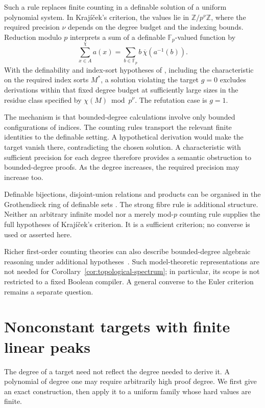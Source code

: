\documentclass[11pt,a4paper]{article}
\theoremstyle{definition}\newtheorem{definition}[theorem]{Definition}
\theoremstyle{remark}\newtheorem{remark}[theorem]{Remark}
\begin{document}
Such a rule replaces finite counting in a definable solution of a
uniform polynomial system. In Kraj\'i\v cek's criterion, the values lie
in $\mathbb Z/p^\nu\mathbb Z$, where the required precision $\nu$
depends on the degree budget and the indexing bounds. Reduction modulo
$p$ interprets a sum of a definable $\mathbb F_p$-valued function by
\[
 \sum_{x\in A}^{\chi}a(x)
       =\sum_{b\in\mathbb F_p}b\,\overline\chi(a^{-1}(b)).
\]
With the definability and index-sort hypotheses of
\cite[Theorem~6.1]{KrajEuler}, including the characteristic on the
required index sorts $M^*$, a solution violating the target $g=0$
excludes derivations within that fixed degree budget at sufficiently
large sizes in the residue class specified by $\chi(M)\bmod p^\nu$.
The refutation case is $g=1$.

The mechanism is that bounded-degree calculations involve only bounded
configurations of indices. The counting rules transport the relevant
finite identities to the definable setting. A hypothetical derivation
would make the target vanish there, contradicting the chosen solution.
A characteristic with sufficient precision for each degree therefore
provides a semantic obstruction to bounded-degree proofs. As the degree
increases, the required precision may increase too.

Definable bijections, disjoint-union relations and products can be
organised in the Grothendieck ring of definable sets
\cite{KrajScanlon}. The strong fibre rule is additional structure.
Neither an arbitrary infinite model nor a merely mod-$p$ counting rule
supplies the full hypotheses of Kraj\'i\v cek's criterion. It is a
sufficient criterion; no converse is used or asserted here.

Richer first-order counting theories can also describe bounded-degree
algebraic reasoning under additional hypotheses~\cite{PTT}. Such
model-theoretic representations are not needed for
Corollary~\ref{cor:topological-spectrum}; in particular, its scope is
not restricted to a fixed Boolean compiler. A general converse to the
Euler criterion remains a separate question.

\section{Nonconstant targets with finite linear peaks}\label{sec:target-examples}
The degree of a target need not reflect the degree needed to derive it.
A polynomial of degree one may require arbitrarily high proof degree.
We first give an exact construction, then apply it to a uniform family
whose hard values are finite.
\end{document}
